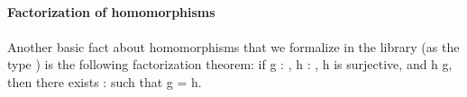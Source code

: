 \begin{code}
\<%
\\
%
\>[2]\AgdaSpace{}%
\AgdaSpace{}%
\AgdaSpace{}%
\AgdaSpace{}%
\AgdaSymbol{=}\AgdaSpace{}%
\AgdaSpace{}%
\AgdaSpace{}%
\AgdaSpace{}%
\AgdaSpace{}%
\AgdaSpace{}%
\<%
\\
%
\>[2]\AgdaSpace{}%
\AgdaSymbol{:}\AgdaSpace{}%
\AgdaSpace{}%
\AgdaSpace{}%
\AgdaSymbol{(}\AgdaSpace{}%
\AgdaSymbol{)}\AgdaSpace{}%
\<%
\\
%
\>[2]\AgdaSpace{}%
\AgdaSpace{}%
\AgdaSymbol{=}\AgdaSpace{}%
\AgdaSpace{}%
\AgdaSpace{}%
\AgdaSpace{}%
\AgdaSpace{}%
\AgdaSpace{}%
\AgdaSpace{}%
\AgdaSpace{}%
\<%
\end{code}

\paragraph*{Factorization of homomorphisms}
\fi      %
Another basic fact about homomorphisms that we formalize in the \agdaalgebras library
(as the type ) is the following factorization theorem: if \ab g : 
 , \ab h :   , \ab h is surjective, and  \ab h
  \ab g, then there exists  :    such that \ab g
=   \ab h.
\ifshort\else

